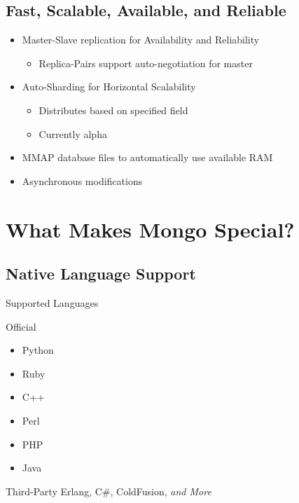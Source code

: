 \documentclass{beamer}
\begin{document}
\subsection{Fast, Scalable, Available, and Reliable}
\begin{frame}
  \begin{itemize}
  \item Master-Slave replication for Availability and Reliability
    \begin{itemize}
      \item Replica-Pairs support auto-negotiation for master
    \end{itemize}
  \item Auto-Sharding for Horizontal Scalability
    \begin{itemize}
      \item Distributes based on specified field
      \item Currently alpha
    \end{itemize}
  \item MMAP database files to automatically use available RAM
  \item Asynchronous modifications
  \end{itemize}
\end{frame}

\section{What Makes Mongo Special?}

\subsection{Native Language Support}

\begin{frame}{Supported Languages}
  \begin{block}{Official}
    \begin{itemize}
      \item Python
      \item Ruby
      \item C++
      \item Perl
      \item PHP
      \item Java
    \end{itemize}
  \end{block}

  \begin{block}{Third-Party}
    Erlang,
    C\#,
    ColdFusion,
    {\it and More}
  \end{block}
\end{frame}
\end{document}
